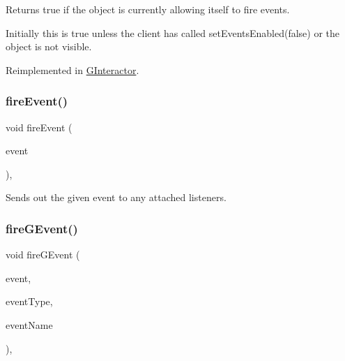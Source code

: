 Returns true if the object is currently allowing itself to fire events. 

Initially this is true unless the client has called {\ttfamily set\+Events\+Enabled(false)} or the object is not visible. 

Reimplemented in \mbox{\hyperlink{classGInteractor_a597a370b592e3737d38d9d2f4e2031ea}{G\+Interactor}}.

\mbox{\label{classGObservable_a63e5e5a6227c59c928493b11aceb0f67}} 
\subsubsection{\texorpdfstring{fire\+Event()}{fireEvent()}}
{\footnotesize\ttfamily void fire\+Event (\begin{DoxyParamCaption}\item[{\mbox{\hyperlink{classGEvent}{G\+Event}} \&}]{event }\end{DoxyParamCaption})\hspace{0.3cm}{\ttfamily [protected]}, {\ttfamily [virtual]}}



Sends out the given event to any attached listeners. 

\mbox{\label{classGObservable_ab3983ea07337b52020a29cc00c653d8d}} 
\subsubsection{\texorpdfstring{fire\+G\+Event()}{fireGEvent()}\hspace{0.1cm}{\footnotesize\ttfamily [1/8]}}
{\footnotesize\ttfamily void fire\+G\+Event (\begin{DoxyParamCaption}\item[{Q\+Event $\ast$}]{event,  }\item[{Event\+Type}]{event\+Type,  }\item[{const std\+::string \&}]{event\+Name }\end{DoxyParamCaption})\hspace{0.3cm}{\ttfamily [protected]}, {\ttfamily [virtual]}}



